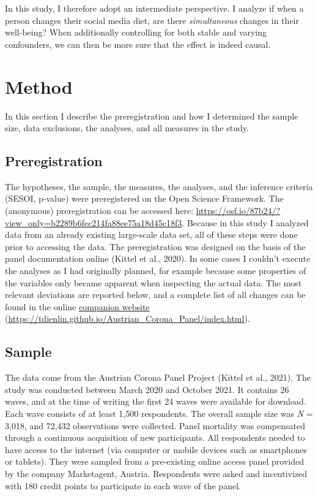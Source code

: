 \documentclass[
  english,
  man,mask,floatsintext]{apa6}
\begin{document}
In this study, I therefore adopt an intermediate perspective.
I analyze if when a person changes their social media diet, are there \emph{simultaneous} changes in their well-being?
When additionally controlling for both stable and varying confounders, we can then be more sure that the effect is indeed causal.

\hypertarget{method}{%
\section{Method}\label{method}}

In this section I describe the preregistration and how I determined the sample size, data exclusions, the analyses, and all measures in the study.

\hypertarget{preregistration}{%
\subsection{Preregistration}\label{preregistration}}

The hypotheses, the sample, the measures, the analyses, and the inference criteria (SESOI, p-value) were preregistered on the Open Science Framework.
The (anonymous) preregistration can be accessed here: \url{https://osf.io/87b24/?view_only=b2289b6fec214fa88ee75a18d45c18f3}.
Because in this study I analyzed data from an already existing large-scale data set, all of these steps were done prior to accessing the data.
The preregistration was designed on the basis of the panel documentation online (Kittel et al., 2020).
In some cases I couldn't execute the analyses as I had originally planned, for example because some properties of the variables only became apparent when inspecting the actual data.
The most relevant deviations are reported below, and a complete list of all changes can be found in the online \href{https://tdienlin.github.io/Austrian_Corona_Panel/index.html}{companion website} (\url{https://tdienlin.github.io/Austrian_Corona_Panel/index.html}).

\hypertarget{sample}{%
\subsection{Sample}\label{sample}}

The data come from the Austrian Corona Panel Project (Kittel et al., 2021).
The study was conducted between March 2020 and October 2021.
It contains 26 waves, and at the time of writing the first 24 waves were available for download.
Each wave consists of at least 1,500 respondents.
The overall sample size was \emph{N} = 3,018, and 72,432 observations were collected.
Panel mortality was compensated through a continuous acquisition of new participants.
All respondents needed to have access to the internet (via computer or mobile devices such as smartphones or tablets).
They were sampled from a pre-existing online access panel provided by the company Marketagent, Austria.
Respondents were asked and incentivized with 180 credit points to participate in each wave of the panel.
\end{document}
